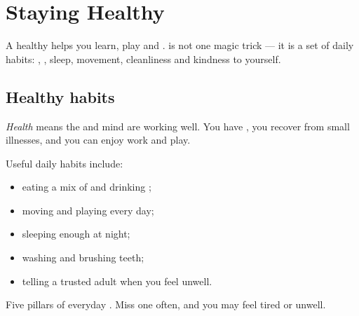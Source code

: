 \chapter{Staying Healthy}\label{ch:g2:healthy}

A healthy  helps you learn, play and .  is not one
magic trick --- it is a set of daily habits: , , sleep,
movement, cleanliness and kindness to yourself.

\section{Healthy habits}

\begin{definition}[Health]\label{def:g2:healthy:health}
\emph{Health} means the  and mind are working
well. You have , you recover from small illnesses, and you
can enjoy work and play.
\end{definition}

\begin{definition}\label{def:g2:healthy:habits}
Useful daily habits include:
\begin{itemize}
  \item eating a mix of  and drinking ;
  \item moving and playing every day;
  \item sleeping enough at night;
  \item washing  and brushing teeth;
  \item telling a trusted adult when you feel unwell.
\end{itemize}
\end{definition}

\begin{omfigure}

{\small Five pillars of everyday . Miss one often, and you
may feel tired or unwell.}
\end{omfigure}

